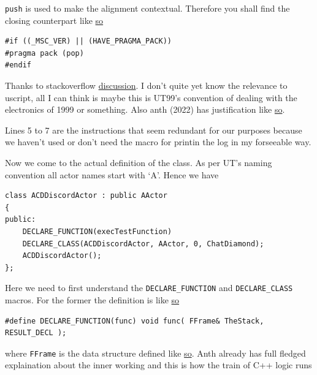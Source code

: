 \documentclass{article}
\theoremstyle{definition}
\begin{document}
\texttt{push} is used to make the alignment contextual.  Therefore you shall find the closing counterpart like \href{https://github.com/ravimohan1991/ChatDiamond/blob/f7950b2591b93a54600459ec58d7ddf57fe9218d/UTNativeEssentials/ChatDiamond/Inc/ActorNativeClass.h#L62}{so}

\lstset{language=C++}
\begin{lstlisting}[frame=single]
#if ((_MSC_VER) || (HAVE_PRAGMA_PACK))
#pragma pack (pop)
#endif
\end{lstlisting}

Thanks to stackoverflow \href{https://stackoverflow.com/questions/3318410/pragma-pack-effect}{discussion}.  I don't quite yet know the relevance to uscript, all I can think is maybe this is UT99's convention 
of dealing with the electronics of 1999 or something.  Also anth (2022) has justification like \href{https://github.com/ravimohan1991/ChatDiamond/blob/f7950b2591b93a54600459ec58d7ddf57fe9218d/UTNativeEssentials/Core/Inc/UnBuild.h#L154-L155}{so}.

Lines 5 to 7 are the instructions that seem redundant for our purposes because we haven't used or don't need the macro for printin the log in my forseeable way.

Now we come to the actual definition of the class.  As per UT's naming convention all actor names start with `A'.  Hence we have

\lstset{language=C++}
\begin{lstlisting}[frame=single]
class ACDDiscordActor : public AActor
{
public:
	DECLARE_FUNCTION(execTestFunction)
	DECLARE_CLASS(ACDDiscordActor, AActor, 0, ChatDiamond);
	ACDDiscordActor();
};
\end{lstlisting}

Here we need to first understand the \texttt{DECLARE\_FUNCTION} and \texttt{DECLARE\_CLASS} macros.  For the former the definition is like \href{https://github.com/ravimohan1991/ChatDiamond/blob/5592fef2b13305e441c1dd2b09dde7dd52ff2d83/UTNativeEssentials/Core/Inc/UnObjBas.h#L829}{so}

\lstset{language=C++}
\begin{lstlisting}[frame=single]
#define DECLARE_FUNCTION(func) void func( FFrame& TheStack, RESULT_DECL );
\end{lstlisting}

where \texttt{FFrame} is the data structure defined like \href{https://github.com/ravimohan1991/ChatDiamond/blob/5592fef2b13305e441c1dd2b09dde7dd52ff2d83/UTNativeEssentials/Core/Inc/UnStack.h#L273}{so}.  Anth already has full fledged explaination about the inner working and this is how
the train of C++ logic runs
\end{document}
